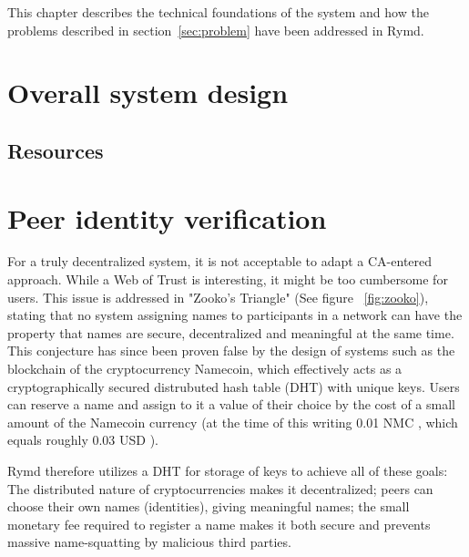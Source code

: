 This chapter describes the technical foundations of the system and how the problems described in section~\ref{sec:problem} have been addressed in Rymd.

\section{Overall system design}
\subsection{Resources}

\section{Peer identity verification}
\label{sec:authorization}

For a truly decentralized system, it is not acceptable to adapt a CA-entered approach. While a Web of Trust is interesting, it might be too cumbersome for users. This issue is addressed in "Zooko's Triangle" (See figure ~\ref{fig:zooko}), stating that no system assigning names to participants in a network can have the property that names are secure, decentralized and meaningful at the same time. This conjecture has since been proven false by the design of systems such as the blockchain of the cryptocurrency Namecoin, which effectively acts as a cryptographically secured distrubuted hash table (DHT) with unique keys. Users can reserve a name and assign to it a value of their choice by the cost of a small amount of the Namecoin currency (at the time of this writing 0.01 NMC \cite{Namecoin:2014:Online}, which equals roughly 0.03 USD \cite{CryptoCoinCharts:2014:Online}).

Rymd therefore utilizes a DHT for storage of keys to achieve all of these goals: The distributed nature of cryptocurrencies makes it decentralized; peers can choose their own names (identities), giving meaningful names; the small monetary fee required to register a name makes it both secure and prevents massive name-squatting by malicious third parties.

